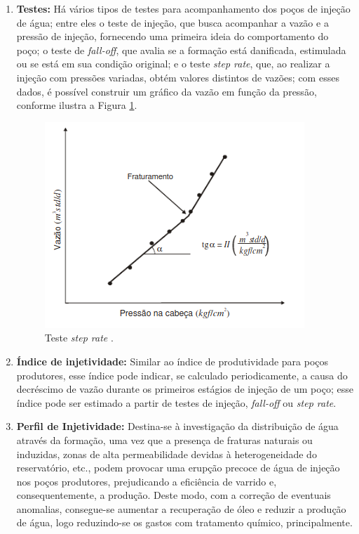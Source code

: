 \begin{enumerate}
\item \textbf{Testes:} H\'{a} v\'{a}rios tipos de testes para acompanhamento dos po\c{c}os de inje\c{c}\~{a}o de \'{a}gua; entre eles o teste de inje\c{c}\~{a}o, que busca acompanhar a vaz\~{a}o e a press\~{a}o de inje\c{c}\~{a}o, fornecendo uma primeira ideia do comportamento do po\c{c}o; o teste de \textit{fall-off}, que avalia se a forma\c{c}\~{a}o est\'{a} danificada, estimulada ou se est\'{a} em sua condi\c{c}\~{a}o original; e o teste \textit{step rate}, que, ao realizar a inje\c{c}\~{a}o com press\~{o}es variadas, obt\'{e}m valores distintos de vaz\~{o}es; com esses dados, \'{e} poss\'{i}vel construir um gr\'{a}fico da vaz\~{a}o em fun\c{c}\~{a}o da press\~{a}o, conforme ilustra a Figura \ref{fig:rev_tst}.

\begin{figure}[!ht]
\centering
\includegraphics[width=.6\textwidth]{figs/revisao/revisao_tst.png}
\caption{Teste \textit{step rate} \cite[p. 660]{engres}.}\label{fig:rev_tst}
\end{figure}

\item \textbf{\'{I}ndice de injetividade:} Similar ao \'{i}ndice de produtividade para po\c{c}os produtores, esse \'{i}ndice pode indicar, se calculado periodicamente, a causa do decr\'{e}scimo de vaz\~{a}o durante os primeiros est\'{a}gios de inje\c{c}\~{a}o de um po\c{c}o; esse \'{i}ndice pode ser estimado a partir de testes de inje\c{c}\~{a}o, \textit{fall-off} ou \textit{step rate}.

\item \textbf{Perfil de Injetividade:} Destina-se \`{a} investiga\c{c}\~{a}o da distribui\c{c}\~{a}o de \'{a}gua atrav\'{e}s da forma\c{c}\~{a}o, uma vez que a presen\c{c}a de fraturas naturais ou induzidas, zonas de alta permeabilidade devidas \`{a} heterogeneidade do reservat\'{o}rio, etc., podem provocar uma erup\c{c}\~{a}o precoce de \'{a}gua de inje\c{c}\~{a}o nos po\c{c}os produtores, prejudicando a efici\^{e}ncia de varrido e, consequentemente, a produ\c{c}\~{a}o. Deste modo, com a corre\c{c}\~{a}o de eventuais anomalias, consegue-se aumentar a recupera\c{c}\~{a}o de \'{o}leo e reduzir a produ\c{c}\~{a}o de \'{a}gua, logo reduzindo-se os gastos com tratamento qu\'{i}mico, principalmente.
\end{enumerate} 


